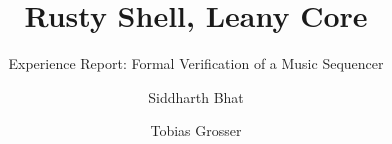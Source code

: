 \documentclass[review, anonymous, sigplan]{acmart}
\begin{document}
\title{Rusty Shell, Leany Core}       %
\subtitle{Experience Report: Formal Verification of a Music Sequencer} %


\author{Siddharth Bhat}

\author{Tobias Grosser}
\end{document}
